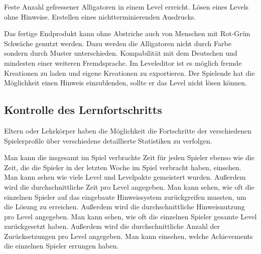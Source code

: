 \begin{requirements}
\begin{requirements}
			 Feste Anzahl gefressener Alligatoren in einem Level erreicht.
			 Lösen eines Levels ohne Hinweise.
			 Erstellen eines nichtterminierenden Ausdrucks.
		\end{requirements}
	Das fertige Endprodukt kann ohne Abstriche auch von Menschen mit Rot-Grün Schwäche genutzt werden. Dazu werden die Alligatoren nicht durch Farbe sondern durch Muster unterschieden.
	Kompabilität mit dem Deutschen und mindesten einer weiteren Fremdsprache.
	Im Leveleditor ist es möglich fremde Kreationen zu laden und eigene Kreationen zu exportieren.
	 Der Spielende hat die Möglichkeit einen Hinweis einzublenden, sollte er das Level nicht lösen können.


\end{requirements}


\subsection{Kontrolle des Lernfortschritts}

\begin{requirements}
	Eltern oder Lehrkörper haben die Möglichkeit die Fortschritte der verschiedenen Spielerprofile über verschiedene detaillierte Statistiken zu verfolgen.
	\begin{requirements}
		 Man kann die insgesamt im Spiel verbrachte Zeit für jeden Spieler ebenso wie die Zeit, die die Spieler in der letzten Woche im Spiel verbracht haben, einsehen.
		 Man kann sehen wie viele Level und Levelpakte gemeistert wurden.
		Außerdem wird die durchschnittliche Zeit pro Level angegeben.
		 Man kann sehen, wie oft die einzelnen Spieler auf das eingebaute Hinweissystem zurückgreifen mussten, um die Lösung zu erreichen.
		Außerdem wird die durchschnittliche Hinweisnutzung pro Level angegeben.
		 Man kann sehen, wie oft die einzelnen Spieler gesamte Level zurückgesetzt haben.
		Außerdem wird die durchschnittliche Anzahl der Zurücksetzungen pro Level angegeben.
		 Man kann einsehen, welche Achievements die einzelnen Spieler errungen haben.
	\end{requirements}
\end{requirements}
